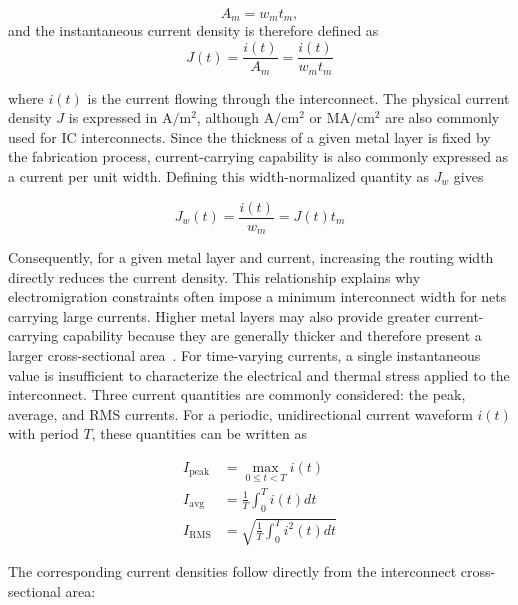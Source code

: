 \begin{equation}
A_m = w_m t_m ,
\label{eq:metal_cross_section}
\end{equation}
and the instantaneous current density is therefore defined as~\cite{layout_fundamentals}
\begin{equation}
J(t) = \frac{i(t)}{A_m} = \frac{i(t)}{w_m t_m}
\label{eq:em_current_density}
\end{equation}

where $i(t)$ is the current flowing through the interconnect. The physical current density $J$ is expressed in $\mathrm{A/m^2}$, although $\mathrm{A/cm^2}$ or $\mathrm{MA/cm^2}$ are also commonly used for \ac{IC} interconnects.
Since the thickness of a given metal layer is fixed by the fabrication process, current-carrying capability is also commonly expressed as a current per unit width. Defining this width-normalized quantity as $J_w$ gives

\begin{equation}
J_w(t) = \frac{i(t)}{w_m} = J(t)t_m
\label{eq:em_current_per_width}
\end{equation}

Consequently, for a given metal layer and current, increasing the routing width directly reduces the current density. This relationship explains why electromigration constraints often impose a minimum interconnect width for nets carrying large currents. Higher metal layers may also provide greater current-carrying capability because they are generally thicker and therefore present a larger cross-sectional area~\cite{razavi,layout_fundamentals}.
For time-varying currents, a single instantaneous value is insufficient to characterize the electrical and thermal stress applied to the interconnect. Three current quantities are commonly considered: the peak, average, and \ac{RMS} currents. For a periodic, unidirectional current waveform $i(t)$ with period $T$, these quantities can be written as

\begin{align}
    I_{\mathrm{peak}} &= \max_{0\leq t<T}{i(t)}
    \label{eq:em_ipeak} \\
    I_{\mathrm{avg}} &= \frac{1}{T} \int_{0}^{T} i(t)dt
    \label{eq:em_iavg} \\
    I_{\mathrm{RMS}} &= \sqrt{\frac{1}{T} \int_{0}^{T} i^2(t)dt}
    \label{eq:em_irms}
\end{align}

The corresponding current densities follow directly from the interconnect cross-sectional area:

